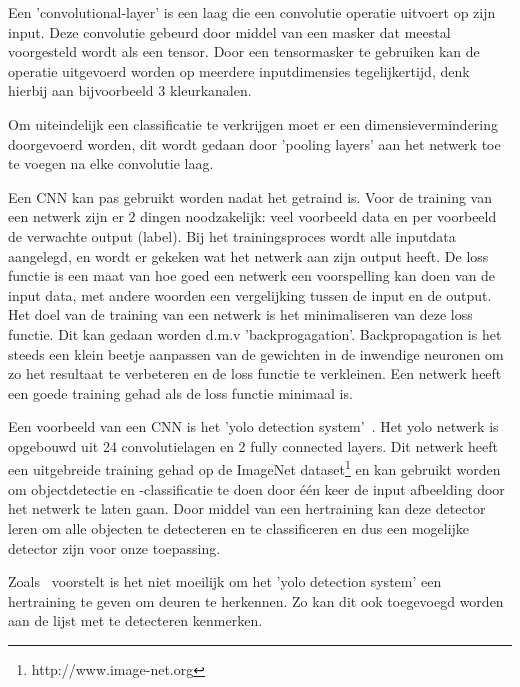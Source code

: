             Een 'convolutional-layer' is een laag die een convolutie operatie uitvoert op zijn input. Deze convolutie gebeurd door middel van een masker dat meestal voorgesteld wordt als een tensor.
            Door een tensormasker te gebruiken kan de operatie uitgevoerd worden op meerdere inputdimensies tegelijkertijd, denk hierbij aan bijvoorbeeld 3 kleurkanalen.

            Om uiteindelijk een classificatie te verkrijgen moet er een dimensievermindering doorgevoerd worden, dit wordt gedaan door 'pooling layers' aan het netwerk toe te voegen na elke convolutie laag. 

            Een CNN kan pas gebruikt worden nadat het getraind is. Voor de training van een netwerk zijn er 2 dingen noodzakelijk: veel voorbeeld data en per voorbeeld de verwachte output (label).
            Bij het trainingsproces wordt alle inputdata aangelegd, en wordt er gekeken wat het netwerk aan zijn output heeft.
            De loss functie is een maat van hoe goed een netwerk een voorspelling kan doen van de input data, met andere woorden een vergelijking tussen de input en de output. Het doel van de training van een netwerk is het minimaliseren
            van deze loss functie. Dit kan gedaan worden d.m.v 'backprogagation'. Backpropagation is het steeds een klein beetje aanpassen van de gewichten in de inwendige neuronen om zo het resultaat te verbeteren en de loss functie te verkleinen.
            Een netwerk heeft een goede training gehad als de loss functie minimaal is.

            Een voorbeeld van een CNN is het '\gls{yolo} detection system'~\cite{Redmon_2016}. Het \gls{yolo} netwerk is opgebouwd uit 24 convolutielagen en 2 fully connected layers.
            Dit netwerk heeft een uitgebreide training gehad op de ImageNet dataset\footnote{http://www.image-net.org} en kan gebruikt worden om objectdetectie en -classificatie te doen door \'{e}\'{e}n keer de input afbeelding door het netwerk te laten gaan.
            Door middel van een hertraining kan deze detector leren om alle objecten te detecteren en te classificeren en dus een mogelijke detector zijn voor onze toepassing.

            Zoals~\cite{Llopart2017} voorstelt is het niet moeilijk om het '\gls{yolo} detection system' een hertraining te geven om deuren te herkennen. Zo kan dit ook toegevoegd worden aan de lijst met te detecteren kenmerken. 


